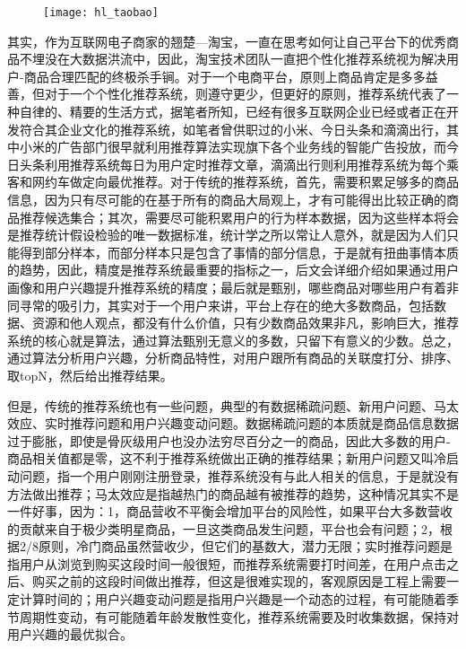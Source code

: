 	\begin{figure}
		\centering
		\texttt{[image: hl\_taobao]}
		\label{fig:hl_taobao}
	\end{figure}
	其实，作为互联网电子商家的翘楚---淘宝，一直在思考如何让自己平台下的优秀商品不埋没在大数据洪流中，因此，淘宝技术团队一直把个性化推荐系统视为解决用户-商品合理匹配的终极杀手锏。对于一个电商平台，原则上商品肯定是多多益善，但对于一个个性化推荐系统，则遵守更少，但更好的原则，推荐系统代表了一种自律的、精要的生活方式，据笔者所知，已经有很多互联网企业已经或者正在开发符合其企业文化的推荐系统，如笔者曾供职过的小米、今日头条和滴滴出行，其中小米的广告部门很早就利用推荐算法实现旗下各个业务线的智能广告投放，而今日头条利用推荐系统每日为用户定时推荐文章，滴滴出行则利用推荐系统为每个乘客和网约车做定向最优推荐。对于传统的推荐系统，首先，需要积累足够多的商品信息，因为只有尽可能的在基于所有的商品大局观上，才有可能得出比较正确的商品推荐候选集合；其次，需要尽可能积累用户的行为样本数据，因为这些样本将会是推荐统计假设检验的唯一数据标准，统计学之所以常让人意外，就是因为人们只能得到部分样本，而部分样本只是包含了事情的部分信息，于是就有扭曲事情本质的趋势，因此，精度是推荐系统最重要的指标之一，后文会详细介绍如果通过用户画像和用户兴趣\citep{user-interests-explore,user-interests-explore1,user-interests-explore2,user-interests-explore3,user-interests-explore4}提升推荐系统的精度；最后就是甄别，哪些商品对哪些用户有着非同寻常的吸引力，其实对于一个用户来讲，平台上存在的绝大多数商品，包括数据、资源和他人观点，都没有什么价值，只有少数商品效果非凡，影响巨大，推荐系统的核心就是算法\citep{date-mining}，通过算法甄别无意义的多数，只留下有意义的少数。总之，通过算法分析用户兴趣，分析商品特性，对用户跟所有商品的关联度打分、排序、取topN，然后给出推荐结果。

	但是，传统的推荐系统也有一些问题，典型的有数据稀疏问题、新用户问题、马太效应、实时推荐问题和用户兴趣变动问题。数据稀疏问题的本质就是商品信息数据过于膨胀，即使是骨灰级用户也没办法穷尽百分之一的商品，因此大多数的用户-商品相关值都是零，这不利于推荐系统做出正确的推荐结果；新用户问题又叫冷启动问题，指一个用户刚刚注册登录，推荐系统没有与此人相关的信息，于是就没有方法做出推荐；马太效应是指越热门的商品越有被推荐的趋势，这种情况其实不是一件好事，因为：1，商品营收不平衡会增加平台的风险性，如果平台大多数营收的贡献来自于极少类明星商品，一旦这类商品发生问题，平台也会有问题；2，根据2/8原则，冷门商品虽然营收少，但它们的基数大，潜力无限；实时推荐问题是指用户从浏览到购买这段时间一般很短，而推荐系统需要打时间差，在用户点击之后、购买之前的这段时间做出推荐，但这是很难实现的，客观原因是工程上需要一定计算时间的；用户兴趣变动问题是指用户兴趣是一个动态的过程，有可能随着季节周期性变动，有可能随着年龄发散性变化，推荐系统需要及时收集数据，保持对用户兴趣的最优拟合。

